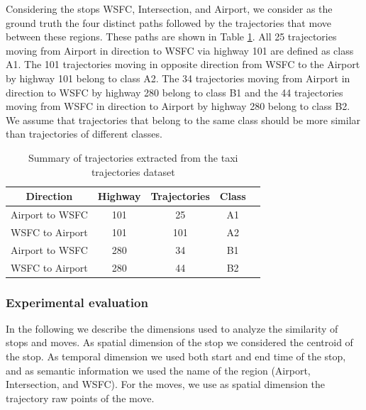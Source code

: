 \documentclass[12pt]{article}
\begin{document}
Considering the stops WSFC, Intersection, and Airport, we consider as the ground truth the four distinct paths followed by the trajectories that move between these regions. These paths are shown in Table \ref{tab:san_francisco_dataset}. All 25 trajectories moving from Airport in direction to WSFC via highway 101 are defined as class A1. The 101 trajectories moving in opposite direction from WSFC to the Airport by highway 101 belong to class A2. The 34 trajectories moving from Airport in direction to WSFC by highway 280 belong to class B1 and the 44 trajectories moving from WSFC in direction to Airport by highway 280 belong to class B2. We assume that trajectories that belong to the same class should be more similar than trajectories of different classes.

\begin{table}[h]
\scriptsize
  \centering
  \begin{tabular}{|c|c|c|c|c|}
  	\hline
 Direction & Highway & Trajectories & Class \\
  	\hline
 Airport to WSFC & 101 & 25 & A1\\
 WSFC to Airport & 101 & 101 & A2\\
 Airport to WSFC & 280 & 34 & B1\\
 WSFC to Airport & 280 & 44 & B2\\
    \hline
  \end{tabular}
  \caption{Summary of trajectories extracted from the taxi trajectories dataset}
  \label{tab:san_francisco_dataset}
\end{table}

\subsubsection{Experimental evaluation}

In the following we describe the dimensions used to analyze the similarity of stops and moves. As spatial dimension of the stop we considered the centroid of the stop. As temporal dimension we used both start and end time of the stop, and as semantic information we used the name of the region (Airport, Intersection, and WSFC). For the moves, we use as spatial dimension the trajectory raw points of the move.
\end{document}
